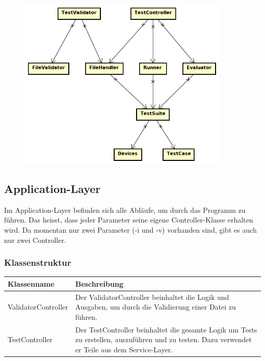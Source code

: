 \documentclass[a4,12pt]{scrartcl}
\begin{document}
\begin{figure} [H]
	\begin{center}
	\includegraphics[width=0.90\textwidth]{./pictures/dependence_diagram.png}
	\label{Bild Referenz}
	\end{center}
\end{figure}


\subsection{Application-Layer}
Im Application-Layer befinden sich alle Abläufe, um durch das Programm zu führen. Das heisst, dass jeder Parameter seine eigene Controller-Klasse erhalten wird. Da momentan nur zwei Parameter (-i und -v) vorhanden sind, gibt es auch nur zwei Controller.
\subsubsection{Klassenstruktur}
\begin{table}[H]
\centering
    \begin{tabular}{@{}l p{11cm} @{}}\toprule    
    {Klassenname} & {Beschreibung}\\ \midrule
    ValidatorController & Der ValidatorController beinhaltet die Logik und Ausgaben, um durch die Validierung einer Datei zu führen.\\       
    TestController & Der TestController beinhaltet die gesamte Logik um Tests zu erstellen, auszuführen und zu testen. Dazu verwendet er Teile aus dem Service-Layer. \\
    \bottomrule
    \end{tabular}
\end{table}
\end{document}
